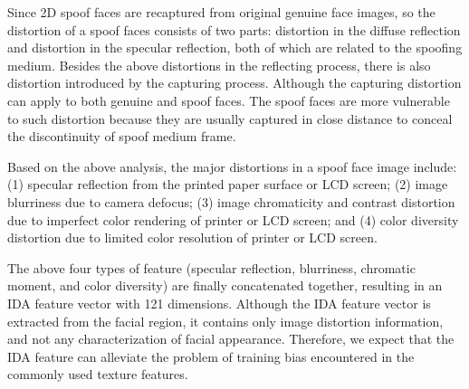 \documentclass[journal]{IEEEtran}
\begin{document}
Since 2D spoof faces are recaptured from original genuine face images, so the distortion of a spoof faces consists of two parts: distortion in the diffuse reflection and distortion in the specular reflection, both of which are related to the spoofing medium. Besides the above distortions in the reflecting process, there is also distortion introduced by the capturing process. Although the capturing distortion can apply to both genuine and spoof faces. The spoof faces are more vulnerable to such distortion because they are usually captured in close distance to conceal the discontinuity of spoof medium frame.

Based on the above analysis, the major distortions in a spoof face image include: (1) specular reflection from the printed paper surface or LCD screen; (2) image blurriness due to camera defocus; (3) image chromaticity and contrast distortion due to imperfect color rendering of printer or LCD screen; and (4) color diversity distortion due to limited color resolution of printer or LCD screen.

The above four types of feature (specular reflection, blurriness, chromatic moment, and color diversity) are finally concatenated together, resulting in an IDA feature vector with 121 dimensions. Although the IDA feature vector is extracted from the facial region, it contains only image distortion information, and not any characterization of facial appearance. Therefore, we expect that the IDA feature can alleviate the problem of training bias encountered in the commonly used texture features.
\end{document}
